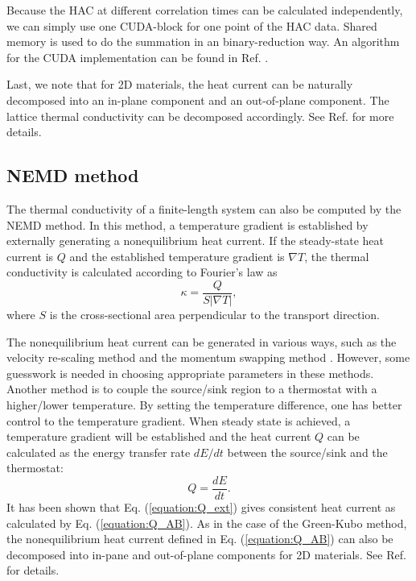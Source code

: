 \documentclass[12pt,a4paper]{report}
\begin{document}
Because the HAC at different correlation times can be calculated independently, we can simply use one CUDA-block for one point of the  HAC data. Shared memory is used to do the summation in an binary-reduction way. An algorithm for the CUDA implementation can be found in Ref. \cite{fan2013cpc}.

Last, we note that for 2D materials, the heat current can be naturally decomposed into an in-plane component and an out-of-plane component. The lattice thermal conductivity can be decomposed accordingly. See Ref. \cite{fan2017prb} for more details.



\subsection{NEMD method}

The thermal conductivity of a finite-length system can also be computed by the NEMD method. In this method, a temperature gradient is established by externally generating a nonequilibrium heat current. If the steady-state heat current is $Q$ and the established temperature gradient is $\nabla T$, the thermal conductivity is calculated according to Fourier's law as
\begin{equation}
\boxed{\kappa = \frac{Q} { S |\nabla T|}},
\end{equation}
where $S$ is the cross-sectional area perpendicular to the transport direction.

The nonequilibrium heat current can be generated in various ways, such as the velocity re-scaling method \cite{ikeshoji1994mp,jund1999prb} and the momentum swapping method  \cite{plathe1997jcp}. However, some guesswork is needed in choosing appropriate parameters in these methods. Another method is to couple the source/sink region to a thermostat with a higher/lower temperature. By setting the temperature difference, one has better control to the temperature gradient. When steady state is achieved, a temperature gradient will be established and the heat current $Q$ can be calculated as the energy transfer rate $d E/d t$ between the source/sink and the thermostat:
\begin{equation}
\boxed{
Q=\frac{dE}{dt}
}.
\label{equation:Q_ext}
\end{equation}
It has been shown \cite{fan2017prb} that Eq. (\ref{equation:Q_ext}) gives consistent heat current as calculated by Eq. (\ref{equation:Q_AB}). As in the case of the Green-Kubo method, the nonequilibrium heat current defined in Eq. (\ref{equation:Q_AB}) can also be decomposed into in-pane and out-of-plane components for 2D materials. See Ref. \cite{fan2017prb} for details.
\end{document}
